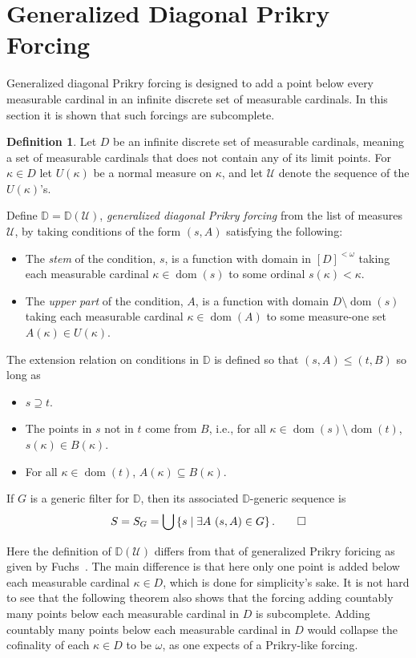 \documentclass{amsart}
\theoremstyle{definition}
\newtheorem{definition}[theorem]{Definition}
\theoremstyle{remark}
\newcommand{\D}{\mathbb{D}}
\newcommand{\U}{\mathcal{U}}
\DeclareMathOperator{\dom}{dom}
\newcommand{\st}{\; | \;}
\newcommand{\set}[2]{\left\{#1\st #2 \right\}}
\begin{document}
\section{Generalized Diagonal Prikry Forcing}
\label{sec:GenDiagonalPrikryForcing}
Generalized diagonal Prikry forcing is designed to add a point below every measurable cardinal in an infinite discrete set of measurable cardinals. In this section it is shown that such forcings are subcomplete.
\begin{definition}
Let $D$ be an infinite discrete set of measurable cardinals, meaning a set of measurable cardinals that does not contain any of its limit points. For $\kappa \in D$ let $U(\kappa)$ be a normal measure on $\kappa$, and let $\U$ denote the sequence of the $U(\kappa)$'s.

Define $\D=\D(\U)$, \emph{generalized diagonal Prikry forcing} from the list of measures $\U$, by taking conditions of the form  
$( s, A )$ satisfying the following:
\begin{itemize}
	\item The \textit{stem} of the condition, $s$, is a function with domain in $[D]^{<\omega}$ taking each measurable cardinal $\kappa \in \dom(s)$ to some ordinal $s(\kappa) < \kappa$.
	\item The \textit{upper part} of the condition, $A$, is a function with domain $D \setminus {\dom(s)}$ taking each measurable cardinal $\kappa \in \dom(A)$ to some measure-one set $A(\kappa) \in U(\kappa)$.
\end{itemize}
The extension relation on conditions in $\D$ is defined so that $( s, A ) \leq ( t, B )$ so long as 
\begin{itemize}
	\item $s \supseteq t$.
	\item The points in $s$ not in $t$ come from $B$, i.e., for all $\kappa \in \dom(s) \setminus \dom(t)$, $s(\kappa) \in B(\kappa)$.
	\item For all $\kappa \in \dom(t)$, $A(\kappa) \subseteq B(\kappa)$.
\end{itemize}
If $G$ is a generic filter for $\D$, then its associated $\D$-generic sequence is \[S = S_G = \bigcup \set{ s }{ \exists A \ ( s, A ) \in G }.\qedhere\]
\end{definition}

Here the definition of $\D(\U)$ differs from that of generalized Prikry foricing as given by Fuchs~\cite{Fuchs:2005kx}. The main difference is that here only one point is added below each measurable cardinal $\kappa \in D$, which is done for simplicity's sake. It is not hard to see that the following theorem also shows that the forcing adding countably many points below each measurable cardinal in $D$ is subcomplete. Adding countably many points below each measurable cardinal in $D$ would collapse the cofinality of each $\kappa \in D$ to be $\omega$, as one expects of a Prikry-like forcing. %
\end{document}
